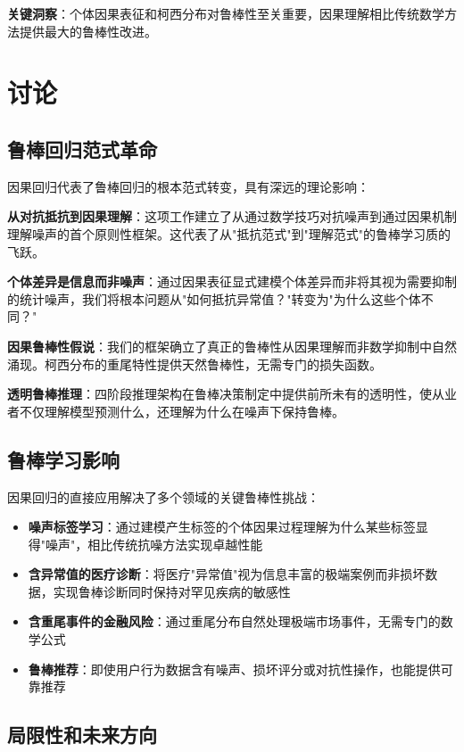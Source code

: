 \documentclass[conference]{IEEEtran}
\begin{document}
\begin{CJK}{UTF8}{gbsn}
\textbf{关键洞察}：个体因果表征和柯西分布对鲁棒性至关重要，因果理解相比传统数学方法提供最大的鲁棒性改进。

\section{讨论}
\label{sec:discussion}

\subsection{鲁棒回归范式革命}

因果回归代表了鲁棒回归的根本范式转变，具有深远的理论影响：

\textbf{从对抗抵抗到因果理解}：这项工作建立了从通过数学技巧对抗噪声到通过因果机制理解噪声的首个原则性框架。这代表了从"抵抗范式"到"理解范式"的鲁棒学习质的飞跃。

\textbf{个体差异是信息而非噪声}：通过因果表征显式建模个体差异而非将其视为需要抑制的统计噪声，我们将根本问题从"如何抵抗异常值？"转变为"为什么这些个体不同？"

\textbf{因果鲁棒性假说}：我们的框架确立了真正的鲁棒性从因果理解而非数学抑制中自然涌现。柯西分布的重尾特性提供天然鲁棒性，无需专门的损失函数。

\textbf{透明鲁棒推理}：四阶段推理架构在鲁棒决策制定中提供前所未有的透明性，使从业者不仅理解模型预测什么，还理解为什么在噪声下保持鲁棒。

\subsection{鲁棒学习影响}

因果回归的直接应用解决了多个领域的关键鲁棒性挑战：

\begin{itemize}
\item \textbf{噪声标签学习}：通过建模产生标签的个体因果过程理解为什么某些标签显得"噪声"，相比传统抗噪方法实现卓越性能
\item \textbf{含异常值的医疗诊断}：将医疗"异常值"视为信息丰富的极端案例而非损坏数据，实现鲁棒诊断同时保持对罕见疾病的敏感性
\item \textbf{含重尾事件的金融风险}：通过重尾分布自然处理极端市场事件，无需专门的数学公式
\item \textbf{鲁棒推荐}：即使用户行为数据含有噪声、损坏评分或对抗性操作，也能提供可靠推荐
\end{itemize}

\subsection{局限性和未来方向}


\end{CJK}
\end{document}

